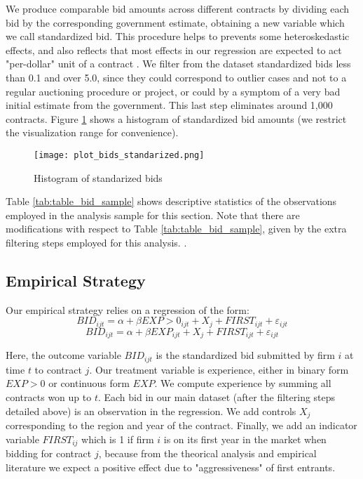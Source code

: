 We produce comparable bid amounts across different contracts by dividing each bid by the corresponding government estimate, obtaining a new variable which we call standardized bid. This procedure helps to prevents some heteroskedastic effects, and also reflects that most effects in our regression are expected to act "per-dollar" unit of a contract \citep{bajari2014bidding}. We filter from the dataset standardized bids less than 0.1 and over 5.0, since they could correspond to outlier cases and not to a regular auctioning procedure or project, or could by a symptom of a very bad initial estimate from the government. This last step eliminates around 1,000 contracts. Figure \ref{fig:plot_bids_standarized} shows a histogram of standardized bid amounts (we restrict the visualization range for convenience).

\begin{figure}
  \centering
  \texttt{[image: plot\_bids\_standarized.png]}
  \caption{Histogram of standarized bids}
  \label{fig:plot_bids_standarized}
\end{figure}

Table \ref{tab:table_bid_sample} shows descriptive statistics of the observations employed in the analysis sample for this section. Note that there are modifications with respect to Table \ref{tab:table_bid_sample}, given by the extra filtering steps employed for this analysis. .

\subsection{Empirical Strategy}

Our empirical strategy relies on a regression of the form:
\begin{equation}
\label{eqn:olsbids}
BID_{ijt}=\alpha+ \beta EXP>0_{ijt}+X_j+FIRST_{ijt}+\varepsilon_{ijt}
\end{equation}
\begin{equation}
\label{eqn:olsbids2}
BID_{ijt}=\alpha+ \beta EXP_{ijt}+X_j+FIRST_{ijt}+\varepsilon_{ijt}
\end{equation}

Here, the outcome variable $BID_{ijt}$ is the standardized bid submitted by firm  $i$ at time $t$  to contract $j$. Our treatment variable is experience, either in binary form $EXP>0$ or continuous form $EXP$. We compute experience by summing all contracts won up to $t$. Each bid in our main dataset (after the filtering steps detailed above) is an observation in the regression. We add controls $X_j$ corresponding to the region and year of the contract. Finally, we add an indicator variable $FIRST_{ij}$ which is 1 if firm $i$ is on its first year in the market when bidding for contract $j$, because from the theorical analysis and empirical literature we expect a positive effect due to "aggressiveness" of first entrants.

